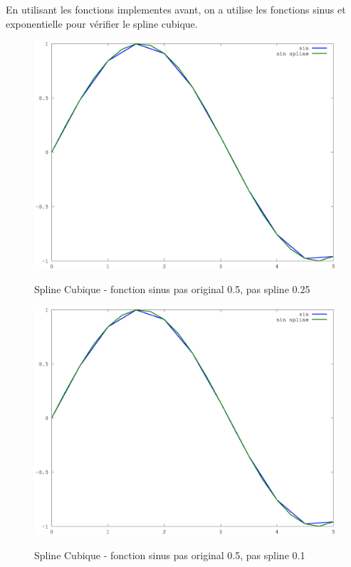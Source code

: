\documentclass[a4paper,11pt]{article}
\begin{document}
En utilisant les  fonctions implementes avant, on a  utilise les fonctions sinus
et exponentielle pour vérifier le spline cubique.

\begin{figure}[h!]
  \begin{centering}
    \includegraphics[scale=0.5]{../sinus_2}
    \label{rspro2}
    \par\end{centering}
  \caption{Spline Cubique - fonction sinus pas original 0.5, pas spline 0.25}
  \label{fig:jacobi-conv}
\end{figure}


\begin{figure}[h!]
  \begin{centering}
    \includegraphics[scale=0.5]{../sinus_2}
    \label{rspro2}
    \par\end{centering}
  \caption{Spline Cubique - fonction sinus pas original 0.5, pas spline 0.1}
  \label{fig:jacobi-conv}
\end{figure}
\end{document}
